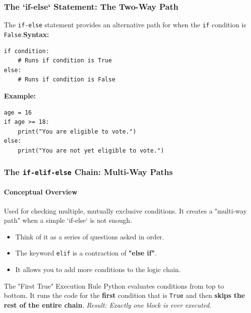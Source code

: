 \documentclass{beamer}
\begin{document}
\begin{frame}[fragile]
                \frametitle{The `if-else` Statement: The Two-Way Path}
                The \texttt{if-else} statement provides an alternative path for when the \texttt{if} condition is \texttt{False}.\n\n\textbf{Syntax:}\n\begin{verbatim}
if condition:
    # Runs if condition is True
else:
    # Runs if condition is False
\end{verbatim}\n\textbf{Example:}\n\begin{verbatim}
age = 16
if age >= 18:
    print("You are eligible to vote.")
else:
    print("You are not yet eligible to vote.")
\end{verbatim}
            \end{frame}

\begin{frame}[fragile]
    \frametitle{The \texttt{if-elif-else} Chain: Multi-Way Paths}
    \framesubtitle{Conceptual Overview}
    
    Used for checking multiple, mutually exclusive conditions. It creates a "multi-way path" when a simple `if-else` is not enough.
    
    \vspace{1em}
    
    \begin{itemize}
        \item Think of it as a series of questions asked in order.
        \item The keyword \texttt{elif} is a contraction of \textbf{"else if"}.
        \item It allows you to add more conditions to the logic chain.
    \end{itemize}
    
    \vspace{1em}
    
    \begin{block}{The "First True" Execution Rule}
        Python evaluates conditions from top to bottom. It runs the code for the \textbf{first} condition that is \texttt{True} and then \textbf{skips the rest of the entire chain}.
        \vspace{0.5em}
        \pause
        \centering\textit{Result: Exactly one block is ever executed.}
    \end{block}
    
\end{frame}
\end{document}
